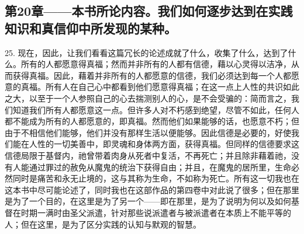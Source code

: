 
\subsection{第20章——本书所论内容。我们如何逐步达到在实践知识和真信仰中所发现的某种。}

25. 现在，因此，让我们看看这篇冗长的论述成就了什么，收集了什么，达到了什么。所有的人都愿意得真福；然而并非所有的人都有信德，藉以心灵得以洁净，从而获得真福。因此，藉着并非所有的人都愿意的信德，我们必须达到每一个人都愿意的真福。所有人在自己心中都看到他们愿意得真福；在这一点上人性的共识如此之大，以至于一个人参照自己的心去揣测别人的心，是不会受骗的：简而言之，我们知道我们所有人都愿意这一点。但许多人对不朽感到绝望，尽管不如此，任何人都不能成为所有的人都愿意的，即真福。然而他们如果能够的话，也愿意不朽；但由于不相信他们能够，他们并没有那样生活以便能够。因此信德是必要的，好使我们能在人性的一切美善中，即灵魂和身体两方面，获得真福。但同样的信德要求这信德局限于基督内，祂曾带着肉身从死者中复活，不再死亡；并且除非藉着祂，没有人能通过罪过的赦免从魔鬼的统治下获得自由；并且，在魔鬼的居所里，生命必然同时是痛苦和永无止境的，这与其称为生命，不如称为死亡。所有这一切我也在这本书中尽可能论述了，同时我也在这部作品的第四卷中对此说了很多；但在那里是为了一个目的，在这里是为了另一个——即在那里，是为了说明为何以及如何基督在时期一满时由圣父派遣，针对那些说派遣者与被派遣者在本质上不能平等的人；但在这里，是为了区分实践的认知与默观的智慧。\par

